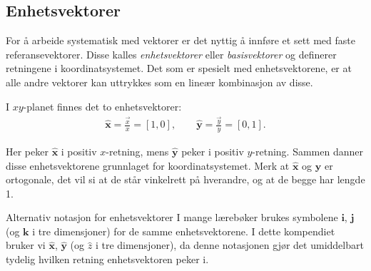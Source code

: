 
\subsection{Enhetsvektorer}

For å arbeide systematisk med vektorer er det nyttig å innføre et sett med faste referansevektorer. Disse kalles \emph{enhetsvektorer} eller \emph{basisvektorer} og definerer retningene i koordinatsystemet. Det som er spesielt med enhetsvektorene, er at alle andre vektorer kan uttrykkes som en lineær kombinasjon av disse.


I $xy$-planet finnes det to enhetsvektorer:
\begin{align}
\hat{\mathbf{x}} = \frac{\vec{x}}{x}=[1,0], \qquad \hat{\mathbf{y}} = \frac{\vec{y}}{y}=[0,1].
\end{align}

Her peker $\hat{\mathbf{x}}$ i positiv $x$-retning, mens $\hat{\mathbf{y}}$ peker i positiv $y$-retning. Sammen danner disse enhetsvektorene grunnlaget for koordinatsystemet.
Merk at $\hat{\mathbf{x}}$ og $\hat{\mathbf{y}}$ er ortogonale, det vil si at de står vinkelrett på hverandre, og at de begge har lengde 1.
\begin{mymerk*}{Alternativ notasjon for enhetsvektorer}
I mange lærebøker brukes symbolene $\mathbf{i}$, $\mathbf{j}$ (og  $\mathbf{k}$ i tre dimensjoner) for de samme enhetsvektorene. I dette kompendiet bruker vi $\hat{\mathbf{x}}$, $\hat{\mathbf{y}}$ (og $\hat{z}$ i tre dimensjoner), da denne notasjonen gjør det umiddelbart tydelig hvilken retning enhetsvektoren peker i.
\end{mymerk*}



